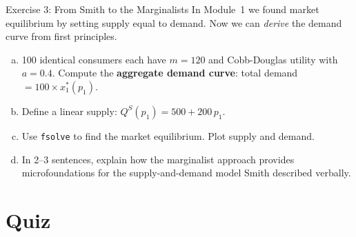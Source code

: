 \documentclass[aspectratio=169, 10pt]{beamer}
\begin{document}
\begin{frame}{Exercise 3: From Smith to the Marginalists}
In Module~1 we found market equilibrium by setting supply equal to demand.
Now we can \textit{derive} the demand curve from first principles.
\vspace{0.5em}
\begin{enumerate}[(a)]
  \item 100 identical consumers each have $m = 120$ and Cobb-Douglas utility
        with $a = 0.4$. Compute the \textbf{aggregate demand curve}:
        total demand $= 100 \times x_1^*(p_1)$.
  \item Define a linear supply: $Q^S(p_1) = 500 + 200\,p_1$.
  \item Use \texttt{fsolve} to find the market equilibrium.
        Plot supply and demand.
  \item In 2--3 sentences, explain how the marginalist approach provides
        \alert{microfoundations} for the supply-and-demand model
        Smith described verbally.
\end{enumerate}
\end{frame}

\section{Quiz}
\end{document}

